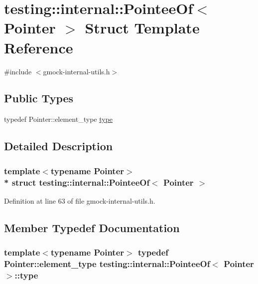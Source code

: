 \hypertarget{structtesting_1_1internal_1_1_pointee_of}{}\section{testing\+:\+:internal\+:\+:Pointee\+Of$<$ Pointer $>$ Struct Template Reference}
\label{structtesting_1_1internal_1_1_pointee_of}


{\ttfamily \#include $<$gmock-\/internal-\/utils.\+h$>$}

\subsection*{Public Types}
\begin{DoxyCompactItemize}
\item 
typedef Pointer\+::element\+\_\+type \hyperlink{structtesting_1_1internal_1_1_pointee_of_aca4d92c8f978e47a8695e82cffc11837}{type}
\end{DoxyCompactItemize}


\subsection{Detailed Description}
\subsubsection*{template$<$typename Pointer$>$\\*
struct testing\+::internal\+::\+Pointee\+Of$<$ Pointer $>$}



Definition at line 63 of file gmock-\/internal-\/utils.\+h.



\subsection{Member Typedef Documentation}
\subsubsection[{\texorpdfstring{type}{type}}]{\setlength{\rightskip}{0pt plus 5cm}template$<$typename Pointer$>$ typedef Pointer\+::element\+\_\+type {\bf testing\+::internal\+::\+Pointee\+Of}$<$ Pointer $>$\+::{\bf type}}\hypertarget{structtesting_1_1internal_1_1_pointee_of_aca4d92c8f978e47a8695e82cffc11837}{}\label{structtesting_1_1internal_1_1_pointee_of_aca4d92c8f978e47a8695e82cffc11837}


